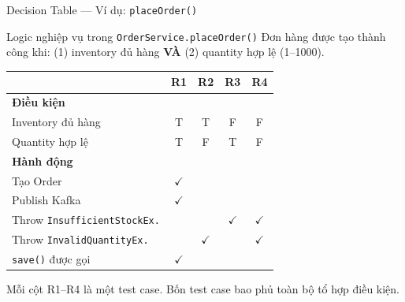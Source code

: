 \documentclass[aspectratio=169,12pt]{beamer}
\begin{document}
\begin{frame}[shrink=20]{Decision Table --- Ví dụ: \texttt{placeOrder()}}
  \begin{block}{Logic nghiệp vụ trong \texttt{OrderService.placeOrder()}}
    Đơn hàng được tạo thành công khi: (1) inventory đủ hàng \textbf{VÀ}
    (2) quantity hợp lệ (1--1000).
  \end{block}

  \vspace{0.4em}
  \begin{center}
  \small
  \begin{tabular}{lcccc}
    \toprule
    & \textbf{R1} & \textbf{R2} & \textbf{R3} & \textbf{R4} \\
    \midrule
    \textbf{Điều kiện} & & & & \\
    \quad Inventory đủ hàng & T & T & F & F \\
    \quad Quantity hợp lệ   & T & F & T & F \\
    \midrule
    \textbf{Hành động} & & & & \\
    \quad Tạo Order     & $\checkmark$ & & & \\
    \quad Publish Kafka    & $\checkmark$ & & & \\
    \quad Throw \texttt{InsufficientStockEx.} & & & $\checkmark$ & $\checkmark$ \\
    \quad Throw \texttt{InvalidQuantityEx.}  & & $\checkmark$ & & $\checkmark$ \\
    \quad \texttt{save()} được gọi & $\checkmark$ & & & \\
    \bottomrule
  \end{tabular}
  \end{center}

  \vspace{0.3em}
  {\small Mỗi cột R1--R4 là một test case. Bốn test case bao phủ
  toàn bộ tổ hợp điều kiện.}
\end{frame}
\end{document}
